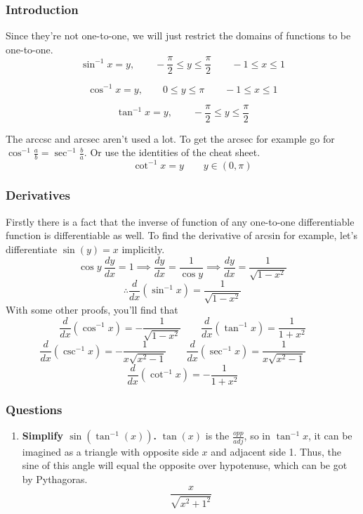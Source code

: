 \documentclass{article}
\begin{document}
\subsubsection{Introduction}

Since they're not one-to-one, we will just restrict the domains of functions to be one-to-one.
\[
	\sin^{-1}x = y, \qquad - \frac{\pi}{2} \leq y \leq \frac{\pi}{2} \qquad -1 \leq x \leq 1
\]

\[
	\cos^{-1}x = y, \qquad  0 \leq y \leq \pi  \qquad -1 \leq x \leq 1
\]

\[
	\tan^{-1}x = y, \qquad - \frac{\pi}{2} \leq y \leq \frac{\pi}{2}
\]


The arccsc and arcsec aren't used a lot. To get the arcsec for example go for $\cos^{-1}\frac{a}{b} = \sec^{-1}{ \frac{b}{a} }$.
Or use the identities of the cheat sheet.
\[
	\qquad  \cot^{-1}x = y \qquad y \in (0,\pi) 
\]

\newpage

\subsubsection{Derivatives}
Firstly there is a fact that the inverse of function of any one-to-one differentiable function is differentiable as well.
To find the derivative of arcsin for example, let's differentiate $\sin(y)=x$ implicitly. \[
	\cos{y} \ \frac{dy}{dx} = 1 \implies \frac{dy}{dx} = \frac{1}{\cos{y}} \implies \frac{dy}{dx} = \frac{1}{\sqrt{1-x^2}}
\]
\[
	\therefore \frac{d}{dx}(\sin^{-1}x) = \frac{1}{\sqrt{1-x^2}}
\]
With some other proofs, you'll find that
\[
	\frac{d}{dx}(\cos^{-1}x) = - \frac{1}{\sqrt{1-x^2}}  \qquad 
	\frac{d}{dx}(\tan^{-1}x) = \frac{1}{1+x^2}	
\]
\[
	\frac{d}{dx}(\csc^{-1}x) = - \frac{1}{x \sqrt{x^2-1}}  \qquad 
	\frac{d}{dx}(\sec^{-1}x) =  \frac{1}{x \sqrt{x^2-1}}   \qquad 
\]
\[
	\frac{d}{dx}(\cot^{-1}x) = - \frac{1}{1+x^2}
\]

\subsubsection{Questions}

\begin{enumerate}[1.]
	\item \textbf{Simplify $ \sin(\tan^{-1}(x))$.}
		$\tan(x)$ is the $\frac{opp}{adj}$, so in $ \tan^{-1}x$, it can be imagined as a triangle with opposite side $x$ and adjacent side 1. Thus, the sine of this angle will equal the opposite over hypotenuse, which can be got by Pythagoras.
		\[
			\frac{x}{\sqrt{x^2+1^2}}
		\]

\end{enumerate}
\end{document}
